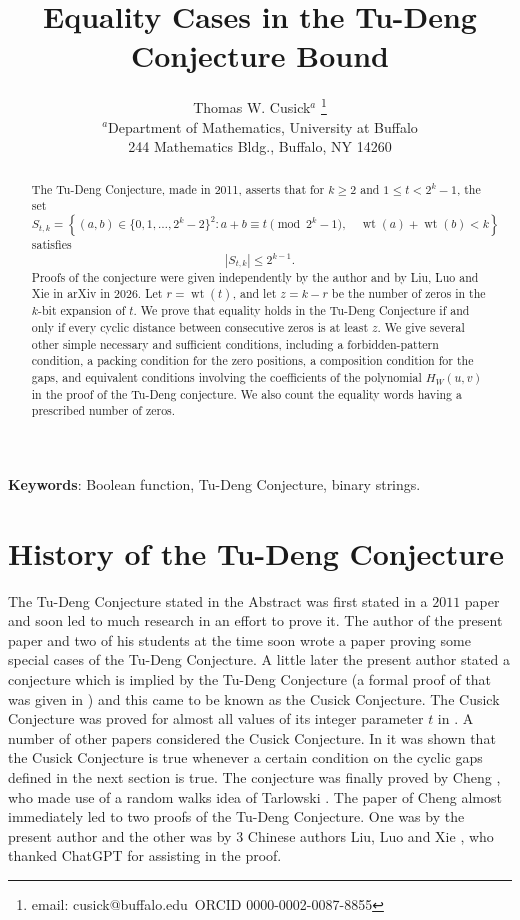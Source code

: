 \documentclass[11pt]{article}
\title{Equality Cases in the Tu-Deng Conjecture Bound}
\author{Thomas W. Cusick$^a$ \footnote{email: cusick@buffalo.edu~ORCID 0000-0002-0087-8855}
\vspace{.5cm}\\
$^a$\small Department of Mathematics,
\small University at Buffalo\\
\small 244 Mathematics Bldg.,  Buffalo, NY 14260\\}
\date{}
\newcommand{\wt}{\operatorname{wt}}
\begin{document}
\maketitle

\begin{abstract}
The Tu-Deng Conjecture, made in 2011, asserts that for $k\geq2$ and
$1\leq t<2^k-1$, the set
\[
S_{t,k}=\left\{(a,b)\in\{0,1,\ldots,2^k-2\}^2:
 a+b\equiv t\pmod{2^k-1},\quad \wt(a)+\wt(b)<k\right\}
\]
satisfies
\[
                         |S_{t,k}|\leq 2^{k-1}.
\]
Proofs of the conjecture were given independently by the author and by
Liu, Luo and Xie in arXiv in 2026.  Let $r=\wt(t)$, and let $z=k-r$ be the
number of zeros in the $k$-bit expansion of $t$.  We prove that equality
holds in the Tu-Deng Conjecture if and only if every cyclic distance
between consecutive zeros is at least $z$.  We give several other simple
necessary and sufficient conditions, including a forbidden-pattern
condition, a packing condition for the zero positions, a composition
condition for the gaps, and equivalent conditions involving the
coefficients of the polynomial $H_W(u,v)$ in the proof of the Tu-Deng
conjecture.  We also count the equality words having a prescribed number
of zeros.
\end{abstract}
{\bf Keywords}: Boolean function, Tu-Deng Conjecture, binary strings.

\section{History of the Tu-Deng Conjecture}
The Tu-Deng Conjecture stated in the Abstract was first stated in a $2011$
paper \cite{TuDeng} and soon led to much research in an effort to prove it.
The author of the present paper and two of his students at the time soon 
wrote a paper \cite{CLS} proving some special cases of the Tu-Deng Conjecture.
A little later the present author stated a conjecture which is implied by the
Tu-Deng Conjecture (a formal proof of that was given in \cite{ SpW}) 
and this came to be known as the Cusick Conjecture. The Cusick Conjecture
was proved for almost all values of its integer parameter $t$ in \cite{DKS}. A number 
of other papers considered the Cusick Conjecture. In \cite{SpW2} it was shown
that the Cusick Conjecture is true whenever a certain condition on the cyclic
gaps defined in the next section is true. The conjecture was finally proved by
Cheng \cite{Cheng}, who made use of a random walks idea of Tarlowski \cite{Tar}.
The paper of Cheng almost immediately led to two proofs of the Tu-Deng
Conjecture. One was by the present author \cite{Proof} and the other was by $3$ 
Chinese authors Liu, Luo and Xie \cite{LLX}, who thanked ChatGPT for assisting
in the proof.
 
\end{document}
